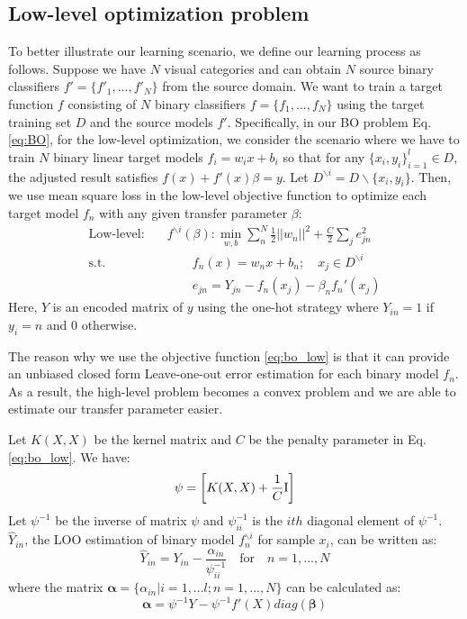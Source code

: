 \subsection{Low-level optimization problem}
To better illustrate our learning scenario, we define our learning process as follows. Suppose we have $N$ visual categories and 
can obtain $N$ source binary classifiers $f'=\{f'_1,...,f'_N\}$ from the source domain. We want to train a target function $f$ consisting of $N$ binary classifiers $f=\{f_1,...,f_N\}$ using the target training set $D$ and the source models $f'$.
Specifically, in our BO problem Eq. \eqref{eq:BO}, for the low-level optimization, we consider the scenario where we have to train $N$ binary linear target models $f_i = w_ix+b_i$ so that for any $\{x_i,y_i\}_{i=1}^l \in D$, the adjusted result satisfies $f(x)+f'(x)\beta = y$. Let $D^{\backslash i} = D\backslash\{x_i,y_i\}$.
Then, we use mean square loss in the low-level objective function to optimize each target model $f_n$ with any given transfer parameter $\beta$:
\begin{equation}\label{eq:bo_low}
\begin{aligned}
\text{Low-level:}\quad&f^{\backslash i}(\beta) : \underset{w,b}{\min} \sum_n^N\frac{1}{2}||w_n||^2+\frac{C}{2}\sum_je^2_{jn}\\
\text{s.t.} &\qquad f_n(x) = w_nx+b_n; \quad x_j \in D^{\backslash i}\\
&\qquad e_{jn} = Y_{jn}-f_n(x_j)-\beta_n f_n'(x_j)
\end{aligned}
\end{equation}
Here, $Y$ is an encoded matrix of $y$ using the one-hot strategy where $Y_{in} =1$ if $y_i=n$ and 0 otherwise.

The reason why we use the objective function \eqref{eq:bo_low} is that it can provide an unbiased closed form Leave-one-out error estimation for each binary model $f_n$\cite{cawley2006leave}. As a result, the high-level problem becomes a convex problem and we are able to estimate our transfer parameter easier.

Let $K(X,X)$ be the kernel matrix and $C$ be the penalty parameter in Eq.\eqref{eq:bo_low}. We have:
\begin{equation}\label{eq:linear}
\psi=\left[ 
{K(X,X) + \frac{1}{C}{\rm{I}}} \right]
\end{equation}
Let $\psi^{-1}$ be the inverse of matrix $\psi$ and  $\psi_{ii}^{-1}$ is the $ith$ diagonal element of $\psi^{-1}$. $\hat{Y}_{in}$, the LOO estimation of binary model $f^{\backslash i}_n$ for sample $x_i$, can be written as\cite{cawley2006leave}:
\begin{equation} \label{eq:loo}
{\hat Y_{in}} = {Y_{in}} - \frac{{{\alpha _{in}}}}{{\psi_{ii}^{ - 1}}}\quad {\text{for}}\quad n = 1,...,N
\end{equation}
where the matrix $\boldsymbol{\alpha}=\{\alpha_{in}|i=1,...l;n=1,...,N\}$ can be calculated as:
\begin{equation}
\boldsymbol{\alpha} =\psi^{-1} Y - \psi^{-1} f'(X)diag(\boldsymbol{\beta})
\end{equation}

